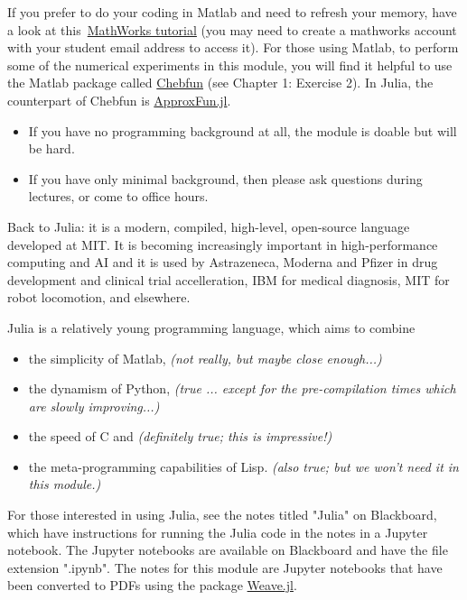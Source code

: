 \documentclass[12pt,a4paper]{article}
\begin{document}
If you prefer to do your coding in Matlab and need to refresh your memory, have a look at this \href{https://matlabacademy.mathworks.com/details/matlab-onramp/gettingstarted}{MathWorks tutorial} (you may need to create a mathworks account with your student email address to access it).  For those using Matlab, to perform some of the numerical experiments in this module, you will find it helpful to use the Matlab package called \href{https://www.chebfun.org/}{Chebfun} (see Chapter 1: Exercise 2).  In Julia, the counterpart of Chebfun is \href{https://github.com/JuliaApproximation/ApproxFun.jl}{ApproxFun.jl}. 

\begin{itemize}
\item If you have no programming background at all, the module is doable but will be hard. 


\item If you have only minimal background, then please ask questions during lectures, or come to office hours.

\end{itemize}
Back to Julia: it is a modern, compiled, high-level, open-source language developed at MIT. It is becoming increasingly important in high-performance computing and AI and it is used by Astrazeneca, Moderna and Pfizer in drug development and clinical trial accelleration, IBM for medical diagnosis, MIT for robot locomotion, and elsewhere.

Julia is a relatively young programming language, which aims to combine 

\begin{itemize}
\item the simplicity of Matlab,   \emph{(not really, but maybe close enough...)}


\item the dynamism of Python,   \emph{(true ... except for the pre-compilation times which are slowly improving...)}


\item the speed of C and   \emph{(definitely true; this is impressive!)}


\item the meta-programming capabilities of Lisp.   \emph{(also true; but we won't need it in this module.)}

\end{itemize}
For those interested in using Julia, see the notes titled "Julia" on Blackboard, which have instructions for running the Julia code in the notes in a Jupyter notebook.  The Jupyter notebooks are available on Blackboard and have the file extension ".ipynb".  The notes for this module are Jupyter notebooks that have been converted to PDFs using the package \href{https://github.com/JunoLab/Weave.jl}{Weave.jl}.
\end{document}
